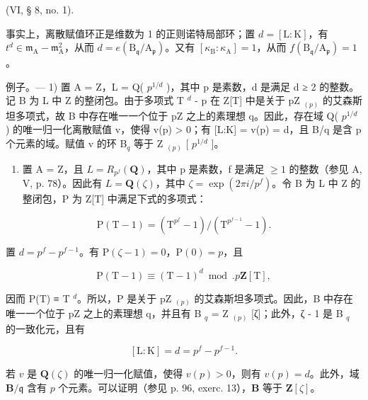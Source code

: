 (VI, § 8, no. 1).

事实上，离散赋值环正是维数为 1 的正则诺特局部环；置 \(d = [\mathrm{L}:\mathrm{K}]\)，有 \(t^{d}\in\mathfrak{m}_{\mathrm{A}}-\mathfrak{m}_{\mathrm{A}}^{2}\)，从而 \(d=e(\mathrm{B}_{\mathfrak{q}}/\mathrm{A}_{\mathfrak{p}})\)。又有 \([\kappa_{\mathrm{B}}:\kappa_{\mathrm{A}}]=1\)，从而 \(f(\mathrm{B}_{\mathfrak{q}}/\mathrm{A}_{\mathfrak{p}})=1\)。

例子。--- 1) 置 A = Z，L = Q( \(p^{1/d}\) )，其中 p 是素数，d 是满足 d ≥ 2 的整数。记 B 为 L 中 Z 的整闭包。由于多项式 T \(^{d}\) - p 在 Z{[}T{]} 中是关于 pZ \(_{(p)}\) 的艾森斯坦多项式，故 B 中存在唯一一个位于 pZ 之上的素理想 q。因此，存在域 Q( \(p^{1/d}\) ) 的唯一归一化离散赋值 v，使得 v(p) \textgreater{} 0；有 {[}L:K{]} = v(p) = d，且 B/q 是含 p 个元素的域。赋值 v 的环 B\(_{q}\) 等于 Z \(_{(p)}\) {[} \(p^{1/d}\) {]}。

\begin{enumerate}
\def\labelenumi{\arabic{enumi})}
\setcounter{enumi}{1}
\tightlist
\item
  置 A = Z，且 \(L = R_{p^{f}}(\mathbf{Q})\)，其中 p 是素数，f 是满足 \(\geqslant 1\) 的整数（参见 A, V, p. 78）。因此有 \(L = \mathbf{Q}(\zeta)\)，其中 \(\zeta = \exp(2\pi i/p^{f})\)。令 B 为 L 中 Z 的整闭包，P 为 Z{[}T{]} 中满足下式的多项式：
\end{enumerate}

\[
\mathrm{P} (\mathrm{T} - 1) = \left(\mathrm{T} ^ {p^{f}} - 1\right) / \left(\mathrm{T} ^ {p^{f - 1}} - 1\right).
\]

置 \(d = p^{f} - p^{f - 1}\)。有 \(\mathrm{P}(\zeta - 1) = 0\)，\(\mathrm{P}(0) = p\)，且

\[
\mathrm{P} (\mathrm{T} - 1) \equiv (\mathrm{T} - 1) ^ {d} \bmod . p \mathbf {Z} [ \mathrm{T} ],
\]

因而 P(T) ≡ T \(^{d}\)。所以，P 是关于 pZ \(_{(p)}\) 的艾森斯坦多项式。因此，B 中存在唯一一个位于 pZ 之上的素理想 q，并且有 B \(_{q}\) = Z \(_{(p)}\) {[}ζ{]}；此外，ζ - 1 是 B \(_{q}\) 的一致化元，且有

\[
[ \mathrm{L}: \mathrm{K} ] = d = p ^ {f} - p ^ {f - 1}.
\]

若 \(v\) 是 \(\mathbf{Q}(\zeta)\) 的唯一归一化赋值，使得 \(v(p)>0\)，则有 \(v(p)=d\)。此外，域 \(\mathbf{B}/\mathfrak{q}\) 含有 \(p\) 个元素。可以证明（参见 p. 96, exerc. 13），\(\mathbf{B}\) 等于 \(\mathbf{Z}[\zeta]\)。



